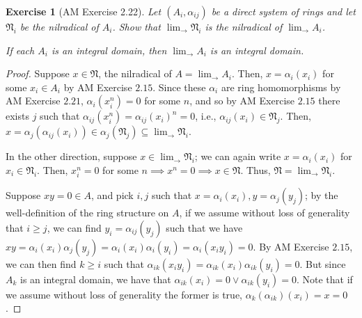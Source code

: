 \documentclass[12pt,letterpaper]{article}
\newtheorem{problem}{Exercise}[section]
\theoremstyle{definition}
\theoremstyle{remark}
\numberwithin{figure}{problem}
\numberwithin{equation}{section}
\begin{document}
\begin{problem}[AM Exercise 2.22]
  Let
  $(A_i,\alpha_{ij})$ be a direct system of rings and let
  $\mathfrak{N}_i$ be the nilradical of
  $A_i$.
  Show that
  $\displaystyle\lim_{\longrightarrow}
  \mathfrak{N}_i$ is the nilradical of
  $\displaystyle\lim_{\longrightarrow}
  A_i$.
  \par If each
  $A_i$ is an integral domain, then
  $\displaystyle\lim_{\longrightarrow}
  A_i$ is an integral domain.
\end{problem}
\begin{proof}
  Suppose
  $x \in
  \mathfrak{N}$, the nilradical of
  $A = \displaystyle\lim_{\longrightarrow}
  A_i$.
  Then,
  $x =
  \alpha_i(x_i)$ for some
  $x_i \in
  A_i$ by AM Exercise
  $2.15$.
  Since these
  $\alpha_i$ are ring homomorphisms by AM Exercise
  $2.21$,
  $\alpha_i(x_i^n) =
  0$ for some
  $n$, and so by AM Exercise
  $2.15$ there exists
  $j$ such that
  $\alpha_{ij}(x_i^n) = \alpha_{ij}(x_i)^n =
  0$, i.e.,
  $\alpha_{ij}(x_i) \in
  \mathfrak{N}_j$.
  Then,
  $x = \alpha_j(\alpha_{ij}(x_i)) \in \alpha_j(\mathfrak{N}_j) \subseteq \displaystyle\lim_{\longrightarrow}
  \mathfrak{N}_i$.
  \par In the other direction, suppose
  $x \in \displaystyle\lim_{\longrightarrow}
  \mathfrak{N}_i$; we can again write
  $x =
  \alpha_i(x_i)$ for
  $x_i \in
  \mathfrak{N}_i$.
  Then,
  $x_i^n =
  0$ for some
  $n \implies x^n = 0 \implies x \in
  \mathfrak{N}$.
  Thus,
  $\mathfrak{N} = \displaystyle\lim_{\longrightarrow}
  \mathfrak{N}_i$.
  \par Suppose
  $xy = 0 \in
  A$, and pick
  $i,j$ such that
  $x = \alpha_i(x_i), y =
  \alpha_j(y_j)$; by the well-definition of the ring structure on
  $A$, if we assume without loss of generality that
  $i \geqslant
  j$, we can find
  $y_i =
  \alpha_{ij}(y_j)$ such that we have
  $xy = \alpha_i(x_i)\alpha_j(y_j) = \alpha_i(x_i)\alpha_i(y_i) = \alpha_i(x_iy_i) =
  0$.
  By AM Exercise
  $2.15$, we can then find
  $k \geqslant
  i$ such that
  $\alpha_{ik}(x_iy_i) = \alpha_{ik}(x_i)\alpha_{ik}(y_i) =
  0$.
  But since
  $A_k$ is an integral domain, we have that
  $\alpha_{ik}(x_i) = 0 \lor \alpha_{ik}(y_i) =
  0$.
  Note that if we assume without loss of generality the former is true,
  $\alpha_k(\alpha_{ik})(x_i) = x =
  0$.
\end{proof}

\printbibliography
\end{document}
